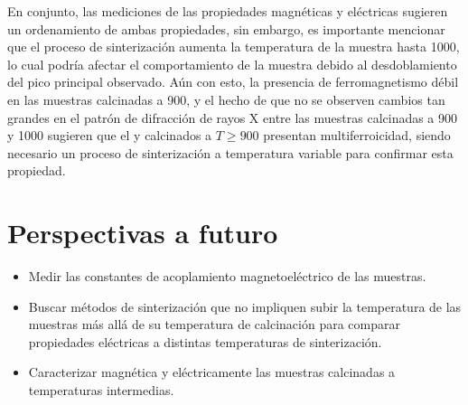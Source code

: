 \documentclass[../main.tex]{subfiles}
\begin{document}
En conjunto, las mediciones de las propiedades magnéticas y eléctricas sugieren un ordenamiento de ambas propiedades, sin embargo, es importante mencionar que el proceso de sinterización aumenta la temperatura de la muestra hasta 1000\gradoC{}, lo cual podría afectar el comportamiento de la muestra debido al desdoblamiento del pico principal observado. Aún con esto, la presencia de ferromagnetismo débil en las muestras calcinadas a 900\gradoC{}, y el hecho de que no se observen cambios tan grandes en el patrón de difracción de rayos X entre las muestras calcinadas a 900 y 1000\gradoC{} sugieren que el \neod{} y \sama{} calcinados a $T\geq900$\gradoC{} presentan multiferroicidad, siendo necesario un proceso de sinterización a temperatura variable para confirmar esta propiedad.
\section{Perspectivas a futuro}
\begin{itemize}
    \item Medir las constantes de acoplamiento magnetoeléctrico de las muestras.
    \item Buscar métodos de sinterización que no impliquen subir la temperatura de las muestras más allá de su temperatura de calcinación para comparar propiedades eléctricas a distintas temperaturas de sinterización.
    \item Caracterizar magnética y eléctricamente las muestras calcinadas a temperaturas intermedias.
\end{itemize}
\end{document}
